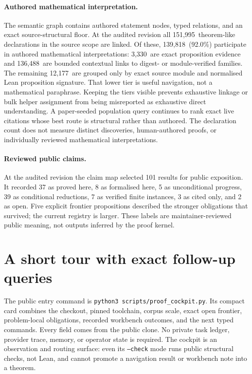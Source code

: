 \documentclass[11pt]{article}
\newcommand{\SemanticAuthoredTheoremLike}{151,995}
\newcommand{\SemanticAuthoredInterpreted}{139,818}
\newcommand{\SemanticDirectEvidence}{3,330}
\newcommand{\SemanticContextual}{136,488}
\newcommand{\SemanticStructuralOnly}{12,177}
\newcommand{\SemanticAuthoredPercent}{92.0}
\begin{document}
\paragraph{Authored mathematical interpretation.}
The semantic graph contains authored statement nodes, typed relations, and an
exact source-structural floor. At the audited revision all
\SemanticAuthoredTheoremLike\ theorem-like declarations in the source scope
are linked.
Of these, \SemanticAuthoredInterpreted\ (\SemanticAuthoredPercent\%) participate
in authored mathematical interpretations: \SemanticDirectEvidence\ are exact
proposition evidence and \SemanticContextual\ are bounded contextual links to
digest- or module-verified families. The remaining \SemanticStructuralOnly\ are grouped only by exact source
module and normalised Lean proposition signature. That lower tier is useful
navigation, not a mathematical paraphrase. Keeping the tiers visible prevents
exhaustive linkage or bulk helper assignment from being misreported as
exhaustive direct understanding. A paper-seeded population query continues to
rank exact live citations whose best route is structural rather than authored.
The declaration count does not measure distinct discoveries, human-authored
proofs, or individually reviewed mathematical interpretations.

\paragraph{Reviewed public claims.}
At the audited revision the claim map selected 101 results for public exposition.
It recorded 37 as proved here, 8 as formalised here, 5 as unconditional progress,
39 as conditional reductions, 7 as verified finite instances, 3 as cited only,
and 2 as open. Five explicit frontier propositions described the stronger
obligations that survived; the current registry is larger. These labels are maintainer-reviewed public meaning,
not outputs inferred by the proof kernel.

\section{A short tour with exact follow-up queries}\label{sec:tour}

The public entry command is
\texttt{python3 scripts/proof\_cockpit.py}.  Its compact card combines the
checkout, pinned toolchain, corpus scale, exact open frontier, problem-local
obligations, recorded workbench outcomes, and the next typed commands.  Every
field comes from the public clone.  No private task ledger, provider trace,
memory, or operator state is required.  The cockpit is an observation and
routing surface: even its \texttt{--check} mode runs public structural checks,
not Lean, and cannot promote a navigation result or workbench note into a
theorem.
\end{document}

